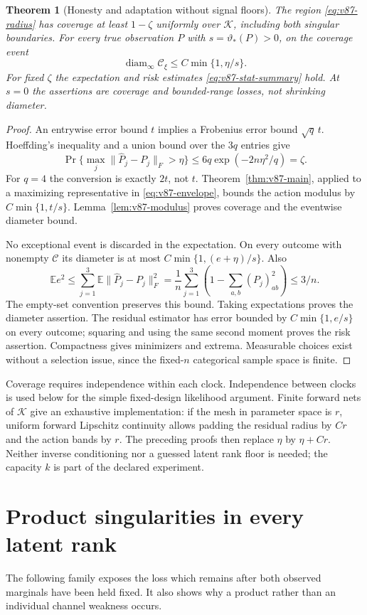 \documentclass[11pt,reqno]{amsart}
\numberwithin{equation}{section}
\newtheorem{theorem}{Theorem}[section]
\theoremstyle{definition}\newtheorem{definition}[theorem]{Definition}
\theoremstyle{remark}\newtheorem{remark}[theorem]{Remark}
\newcommand{\E}{\mathbb E}
\newcommand{\diam}{\operatorname{diam}}
\newcommand{\cK}{\mathcal K}
\newcommand{\cC}{\mathcal C}
\newcommand{\sig}{\vartheta}
\begin{document}
\begin{theorem}[Honesty and adaptation without signal floors]
\label{thm:v87-confidence}
The region \eqref{eq:v87-radius} has coverage at least $1-\zeta$
uniformly over $\cK$, including both singular boundaries. For every
true observation $P$ with $s=\sig_*(P)>0$, on the coverage event
\[
                    \diam_\infty\cC_\xi\le C\min\{1,\eta/s\}.
\]
For fixed $\zeta$ the expectation and risk estimates
\eqref{eq:v87-stat-summary} hold. At $s=0$ the assertions are coverage
and bounded-range losses, not shrinking diameter.
\end{theorem}
\begin{proof}
An entrywise error bound $t$ implies a Frobenius error bound
$\sqrt q\,t$. Hoeffding's inequality and a union bound over the
$3q$ entries give
\[
 \Pr\{\max_j\|\widehat P_j-P_j\|_F>\eta\}
 \le 6q\exp(-2n\eta^2/q)=\zeta.
\]
For $q=4$ the conversion is exactly $2t$, not $t$.
Theorem~\ref{thm:v87-main}, applied to a maximizing representative
in \eqref{eq:v87-envelope}, bounds the action modulus by
$C\min\{1,t/s\}$. Lemma~\ref{lem:v87-modulus} proves coverage
and the eventwise diameter bound.

No exceptional event is discarded in the expectation. On every
outcome with nonempty $\cC$ its diameter is at most
$C\min\{1,(e+\eta)/s\}$. Also
\[
 \E e^2\le\sum_{j=1}^3\E\|\widehat P_j-P_j\|_F^2
     =\frac1n\sum_{j=1}^3\left(1-\sum_{a,b}(P_j)_{ab}^2\right)
     \le3/n.
\]
The empty-set convention preserves this bound. Taking expectations
proves the diameter assertion. The residual estimator has error
bounded by $C\min\{1,e/s\}$ on every outcome; squaring and using
the same second moment proves the risk assertion. Compactness gives
minimizers and extrema. Measurable choices exist without a selection
issue, since the fixed-$n$ categorical sample space is finite.
\end{proof}
Coverage requires independence within each clock. Independence between
clocks is used below for the simple fixed-design likelihood argument.
Finite forward nets of $\cK$ give an exhaustive implementation:
if the mesh in parameter space is $r$, uniform forward Lipschitz
continuity allows padding the residual radius by $C r$ and the action
bands by $r$. The preceding proofs then replace $\eta$ by
$\eta+C r$. Neither inverse conditioning nor a guessed latent rank
floor is needed; the capacity $k$ is part of the declared experiment.

\section{Product singularities in every latent rank}
\label{sec:v87-product}
The following family exposes the loss which remains after both
observed marginals have been held fixed. It also shows why a product
rather than an individual channel weakness occurs.
\end{document}
